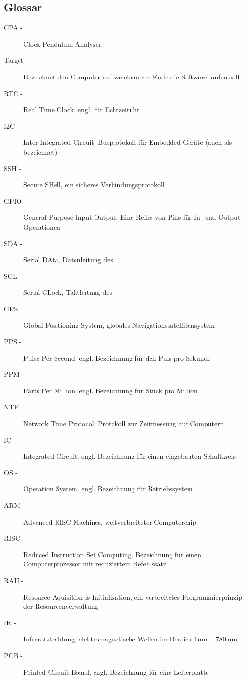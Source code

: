 		\subsection{Glossar}
			\begin{description}
				\item[CPA -] Clock Pendulum Analyzer
                \item[Target -] Bezeichnet den Computer auf welchem am Ende die Software laufen soll
                \item[RTC -] Real Time Clock, engl. für Echtzeituhr
                \item[I2C -] Inter-Integrated Circuit, Busprotokoll für Embedded Geräte (auch als \iic bezeichnet)
                \item[SSH -] Secure SHell, ein sicheres Verbindungsprotokoll
                \item[GPIO -] General Purpose Input Output. Eine Reihe von Pins für In- und Output Operationen
                \item[SDA -] Serial DAta, Datenleitung des \iic
                \item[SCL -] Serial CLock, Taktleitung des \iic
                \item[GPS -] Global Positioning System, globales Navigationssatellitensystem
                \item[PPS -] Pulse Per Second, engl. Bezeichnung für den Puls pro Sekunde
                \item[PPM -] Parts Per Million, engl. Bezeichnung für Stück pro Million
                \item[NTP -] Network Time Protocol, Protokoll zur Zeitmessung auf Computern
                \item[IC -] Integrated Circuit, engl. Bezeichnung für einen eingebauten Schaltkreis
                \item[OS -] Operation System, engl. Bezeichnung für Betriebssystem
                \item[ARM -] Advanced RISC Machines, weitverbreiteter Computerchip
                \item[RISC -] Reduced Instruction Set Computing, Bezeichnung für einen Computerprozessor mit reduziertem Befehlssatz
                \item[RAII -] Resource Aquisition is Initialization, ein verbreitetes Programmierprinzip der Resourcenverwaltung
                \item[IR -] Infrarotstrahlung,  elektromagnetische Wellen im Bereich 1mm - 780mm
                \item[PCB -] Printed Circuit Board, engl. Bezeichnung für eine Leiterplatte

\end{description}
